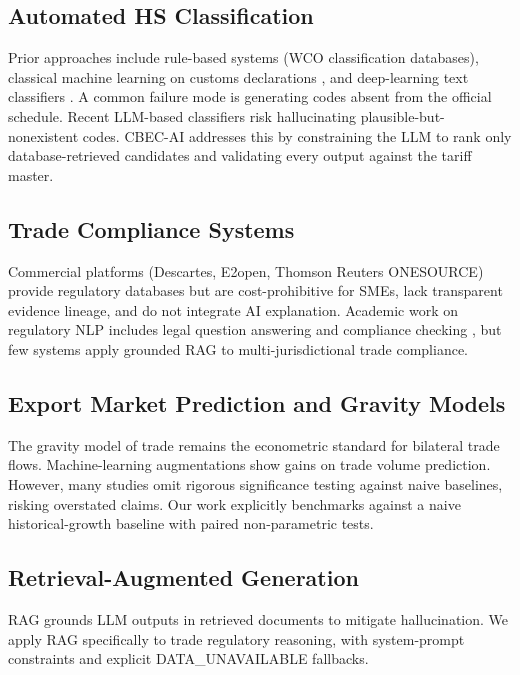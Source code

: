 \documentclass[conference]{IEEEtran}
\begin{document}
\subsection{Automated HS Classification}
Prior approaches include rule-based systems (WCO classification
databases), classical machine learning on customs declarations
\cite{ding2015,turhan2019}, and deep-learning text classifiers
\cite{kim2020}. A common failure mode is generating codes absent from the
official schedule. Recent LLM-based classifiers risk hallucinating
plausible-but-nonexistent codes. CBEC-AI addresses this by constraining
the LLM to rank only database-retrieved candidates and validating every
output against the tariff master.

\subsection{Trade Compliance Systems}
Commercial platforms (Descartes, E2open, Thomson Reuters ONESOURCE)
provide regulatory databases but are cost-prohibitive for SMEs, lack
transparent evidence lineage, and do not integrate AI explanation.
Academic work on regulatory NLP includes legal question answering
\cite{cui2023} and compliance checking \cite{zhang2023}, but few systems
apply grounded RAG to multi-jurisdictional trade compliance.

\subsection{Export Market Prediction and Gravity Models}
The gravity model of trade \cite{tinbergen1962,anderson2003} remains the
econometric standard for bilateral trade flows. Machine-learning
augmentations \cite{batarseh2021} show gains on trade volume prediction.
However, many studies omit rigorous significance testing against naive
baselines, risking overstated claims. Our work explicitly benchmarks
against a naive historical-growth baseline with paired non-parametric
tests.

\subsection{Retrieval-Augmented Generation}
RAG \cite{lewis2020} grounds LLM outputs in retrieved documents to
mitigate hallucination. We apply RAG specifically to trade regulatory
reasoning, with system-prompt constraints and explicit DATA\_UNAVAILABLE
fallbacks.

\end{document}
